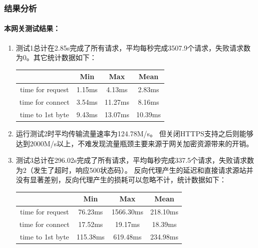 \documentclass[twoside]{CUGThesis}
\begin{document}
	\subsubsection{结果分析}
	\paragraph{本网关测试结果：}
	\begin{enumerate}
	\item 测试1总计在2.85s完成了所有请求，平均每秒完成3507.9个请求，失败请求数为0。其它统计数据如下：
	\begin{center}
	\begin{tabular}{|c|c|c|c|} 
		\hline
		 \ & Min & Max & Mean  \\ \hline
		time for request & 1.15ms  & 4.13ms & 2.83ms \\ \hline
		time for connect & 3.54ms & 11.27ms & 8.16ms \\ \hline
		time to 1st byte & 9.43ms  & 13.07ms & 10.39ms \\
		\hline
	\end{tabular}
	\end{center}
	\item 运行测试2时平均传输流量速率为124.78M/s。
	但关闭HTTPS支持之后则能够达到2000M/s以上，不难发现流量瓶颈主要来源于网关加密资源带来的开销。
	\item 测试3总计在296.02s完成了所有请求，平均每秒完成337.5个请求，失败请求数为2（发生了超时，响应500状态码）。
	反向代理产生的延迟和直接请求源站并没有显著差别，反向代理产生的损耗可以忽略不计，统计数据如下：
	\begin{center}
		\begin{tabular}{|c|c|c|c|} 
			\hline
			 \ & Min & Max & Mean  \\ \hline
			time for request & 76.23ms  & 1566.30ms & 218.10ms \\ \hline
			time for connect & 17.52ms & 19.17ms & 18.39ms \\ \hline
			time to 1st byte & 115.38ms  & 619.48ms & 234.98ms \\
			\hline
		\end{tabular}
		\end{center}
	\end{enumerate}
\end{document}
